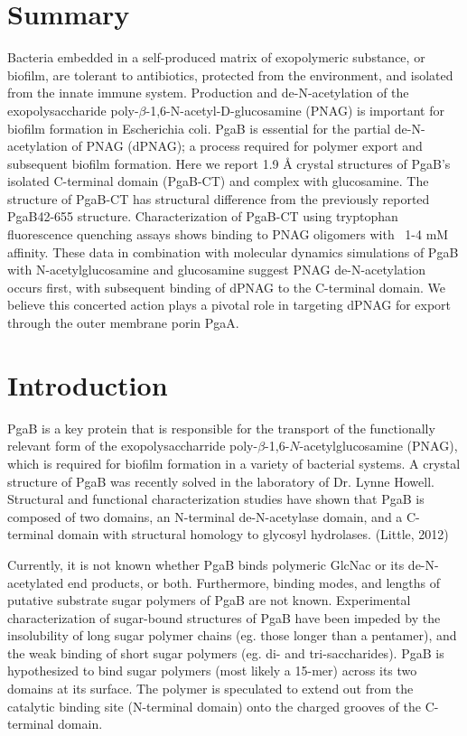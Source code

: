 \section{Summary}
Bacteria embedded in a self-produced matrix of exopolymeric substance, or biofilm, are tolerant to antibiotics, protected from the environment, and isolated from the innate immune system. Production and de-N-acetylation of the exopolysaccharide poly-$\beta$-1,6-N-acetyl-D-glucosamine (PNAG) is important for biofilm formation in Escherichia coli. PgaB is essential for the partial de-N-acetylation of PNAG (dPNAG); a process required for polymer export and subsequent biofilm formation. Here we report 1.9 Å crystal structures of PgaB’s isolated C-terminal domain (PgaB-CT) and complex with glucosamine. The structure of PgaB-CT has structural difference from the previously reported PgaB42-655 structure. Characterization of PgaB-CT using tryptophan fluorescence quenching assays shows binding to PNAG oligomers with ~1-4 mM affinity. These data in combination with molecular dynamics simulations of PgaB with N-acetylglucosamine and glucosamine suggest PNAG de-N-acetylation occurs first, with subsequent binding of dPNAG to the C-terminal domain. We believe this concerted action plays a pivotal role in targeting dPNAG for export through the outer membrane porin PgaA.

\section{Introduction}

PgaB is a key protein that is responsible for the transport of the functionally relevant form of the exopolysaccharride poly-$\beta$-1,6-$N$-acetylglucosamine (PNAG), which is required for biofilm formation in a variety of bacterial systems. A crystal structure of PgaB was recently solved in the laboratory of Dr. Lynne Howell. Structural and functional characterization studies have shown that PgaB is composed of two domains, an N-terminal de-N-acetylase domain, and a C-terminal domain with structural homology to glycosyl hydrolases. (Little, 2012)

Currently, it is not known whether PgaB binds polymeric GlcNac or its de-N-acetylated end products, or both. Furthermore, binding modes, and lengths of putative substrate sugar polymers of PgaB are not known. Experimental characterization of sugar-bound structures of PgaB have been impeded by the insolubility of long sugar polymer chains (eg. those longer than a pentamer), and the weak binding of short sugar polymers (eg. di- and tri-saccharides). PgaB is hypothesized to bind sugar polymers (most likely a 15-mer) across its two domains at its surface. The polymer is speculated to extend out from the catalytic binding site (N-terminal domain) onto the charged grooves of the C-terminal domain.

